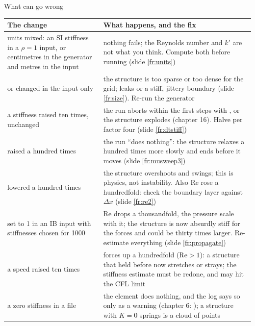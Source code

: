 \documentclass[aspectratio=169,11pt]{beamer}
\begin{document}
\begin{frame}{What can go wrong}
\label{fr:wrong}
\scriptsize
\begin{tabular}{@{}L{0.32\textwidth}L{0.6\textwidth}@{}}
\toprule
The change & What happens, and the fix\\
\midrule
units mixed: an SI stiffness in a $\rho = 1$ input, or centimetres in the generator and metres in the input & nothing fails; the Reynolds number and $k'$ are not what you think. Compute both before running (slide \ref{fr:units})\\
 or  changed in the input only & the structure is too sparse or too dense for the grid; leaks or a stiff, jittery boundary (slide \ref{fr:size}). Re-run the generator\\
a stiffness raised ten times,  unchanged & the run aborts within the first steps with , or the structure explodes (chapter 16). Halve  per factor four (slide \ref{fr:dtstiff})\\
 raised a hundred times & the run ``does nothing'': the structure relaxes a hundred times more slowly and  ends before it moves (slide \ref{fr:musweep3})\\
 lowered a hundred times & the structure overshoots and swings; this is physics, not instability. Also $\mathrm{Re}$ rose a hundredfold: check the boundary layer against $\Delta x$ (slide \ref{fr:re2})\\
 set to 1 in an IB input with stiffnesses chosen for 1000 & $\mathrm{Re}$ drops a thousandfold, the pressure scale with it; the structure is now absurdly stiff for the forces and  could be thirty times larger. Re-estimate everything (slide \ref{fr:propagate})\\
a speed raised ten times & forces up a hundredfold ($\mathrm{Re} > 1$): a structure that held before now stretches or strays; the stiffness estimate must be redone, and  may hit the CFL limit\\
a zero stiffness in a file & the element does nothing, and the log says so only as a warning (chapter 6: ); a structure with $K = 0$ springs is a cloud of points\\
\bottomrule
\end{tabular}
\end{frame}
\end{document}
